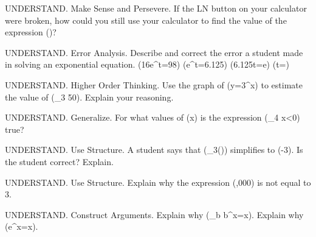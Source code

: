 \documentclass{article}
\newenvironment{practice}[2]{}{}        %
\newcommand{\answer}[1]{}               %
\newcommand{\placeholder}[2]{}          %
\newcommand{\te}[1]{}                   %
\begin{document}
\begin{practice}{13}{3}
UNDERSTAND. Make Sense and Persevere. If the LN button on your calculator were broken, how could you still use your calculator to find the value of the expression ()?
\answer{Graph (y=e^x) and use the graph to find an approximate value of (x) for which (y) is equal to 65.}
\end{practice}
\begin{practice}{14}{2}
UNDERSTAND. Error Analysis. Describe and correct the error a student made in solving an exponential equation.
(16e^t=98)
(e^t=6.125)
(6.125t=\ln e)
(t=)
\te{The student's work is marked with a red X.}
\answer{The student did not convert to logarithmic form correctly. The solution should be (t=\ln6.125).}
\end{practice}
\begin{practice}{15}{3}
UNDERSTAND. Higher Order Thinking. Use the graph of (y=3^x) to estimate the value of (\log_3 50). Explain your reasoning.
\placeholder{graph}{First-quadrant square grid, x horizontal right arrow and y vertical up arrow; x labeled 0, 2, 4 with grid spacing 0.5, y labeled 0, 20, 40, 60, 80 with grid spacing 10. Window x 0 to 4.5, y 0 to 90. Red increasing exponential y=3^x passes (0,1), (2,9), (3,27), (4,81), upward arrow near (4.1,90); no plotted dot markers.}
\answer{3.5; (\log_3 50) is an expression equivalent to (3^x=50), so you need to find the value of (x) for which (y=50).}
\end{practice}
\begin{practice}{16}{2}
UNDERSTAND. Generalize. For what values of (x) is the expression (\log_4 x<0) true?
\answer{(\{x\mid0<x<1\})}
\end{practice}
\begin{practice}{17}{3}
UNDERSTAND. Use Structure. A student says that (\log_3()) simplifies to (-3). Is the student correct? Explain.
\answer{yes; (3^{-3}=\frac1{27})}
\end{practice}
\begin{practice}{18}{3}
UNDERSTAND. Use Structure. Explain why the expression (,000) is not equal to 3.
\answer{Because the base is e and (e^3) is not equal to 1,000.}
\end{practice}
\begin{practice}{19}{1}
UNDERSTAND. Construct Arguments. Explain why (\log_b b^x=x). Explain why (e^{\ln x}=x).
\answer{(y=\log_b x) and (y=b^x) are inverses. Part of the definition of inverses is that (f(g(x))=x=g(f(x))). It follows that (\log_b b^x=x). Since (y=e^x) and (y=\ln x) are inverses, then the same reasoning applies for (e^{\ln x}=x).}
\end{practice}
\end{document}
